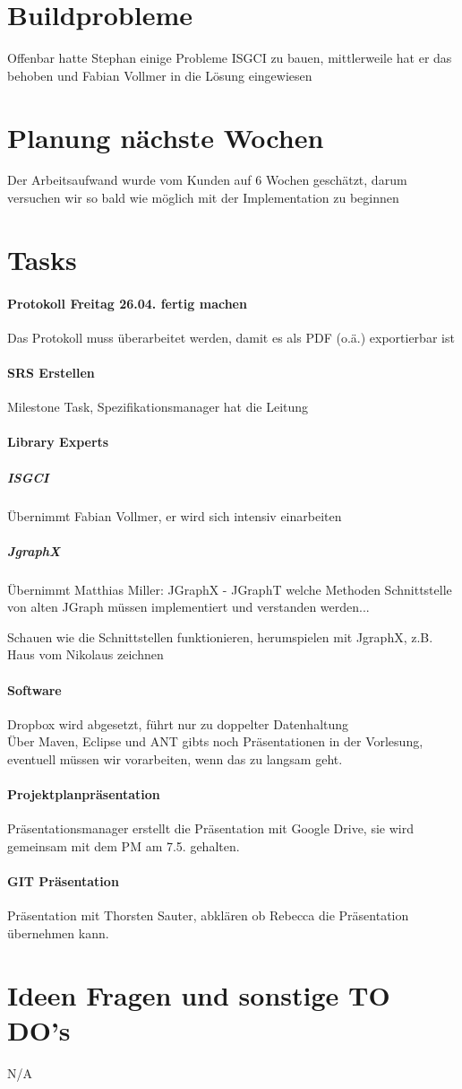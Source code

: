 \documentclass{scrartcl}
\begin{document}
\section{Buildprobleme}
Offenbar hatte Stephan einige Probleme ISGCI zu bauen, mittlerweile hat er das behoben und Fabian Vollmer in die Lösung eingewiesen
\section{Planung nächste Wochen}
Der Arbeitsaufwand wurde vom Kunden auf 6 Wochen geschätzt, darum versuchen wir so bald wie möglich mit der Implementation zu beginnen
\section{Tasks}
\paragraph{Protokoll Freitag 26.04. fertig machen} Das Protokoll muss überarbeitet werden, damit es als PDF (o.ä.) exportierbar ist
\paragraph{SRS Erstellen} Milestone Task, Spezifikationsmanager hat die Leitung
\paragraph{Library Experts}
\subparagraph{ISGCI} Übernimmt Fabian Vollmer, er wird sich intensiv einarbeiten
\subparagraph{JgraphX} Übernimmt Matthias Miller: JGraphX - JGraphT welche Methoden Schnittstelle von alten JGraph müssen implementiert und verstanden werden...

Schauen wie die Schnittstellen funktionieren, herumspielen mit JgraphX, z.B. Haus vom Nikolaus zeichnen
\paragraph{Software}
Dropbox wird abgesetzt, führt nur zu doppelter Datenhaltung \\
Über Maven, Eclipse und ANT gibts noch Präsentationen in der Vorlesung, eventuell müssen wir vorarbeiten, wenn das zu langsam geht.
\paragraph{Projektplanpräsentation} Präsentationsmanager erstellt die Präsentation mit Google Drive, sie wird gemeinsam mit dem PM am 7.5. gehalten.
\paragraph{GIT Präsentation} Präsentation mit Thorsten Sauter, abklären ob Rebecca die Präsentation übernehmen kann.
\section{Ideen Fragen und sonstige TO DO's}
N/A
\end{document}
